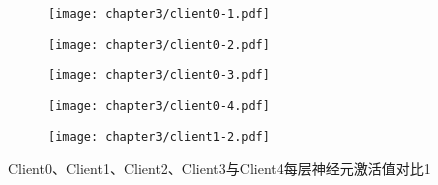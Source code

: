 \begin{figure}[thbp]
    \centering
    \begin{subfigure}[b]{\textwidth}
        \centering
        \texttt{[image: chapter3/client0-1.pdf]}
        \label{fig:3-1client0-1}
    \end{subfigure}
    
    \vspace{0.3cm} %
    
    \begin{subfigure}[b]{\textwidth}
        \centering
        \texttt{[image: chapter3/client0-2.pdf]}
        \label{fig:3-1client0-2}
    \end{subfigure}
    
    \vspace{0.3cm} %
    
    \begin{subfigure}[b]{\textwidth}
        \centering
        \texttt{[image: chapter3/client0-3.pdf]}
        \label{fig:3-1client0-3}
    \end{subfigure}

    \vspace{0.3cm} %
    
    \begin{subfigure}[b]{\textwidth}
        \centering
        \texttt{[image: chapter3/client0-4.pdf]}
        \label{fig:3-1client0-4}
    \end{subfigure}
    
    \vspace{0.3cm} %
    
    \begin{subfigure}[b]{\textwidth}
        \centering
        \texttt{[image: chapter3/client1-2.pdf]}
        \label{fig:3-1client1-2}
    \end{subfigure}

    \vspace{0.2cm}
    \caption{Client0、Client1、Client2、Client3与Client4每层神经元激活值对比1}
    \label{fig:compare-clients0}
\end{figure}   

